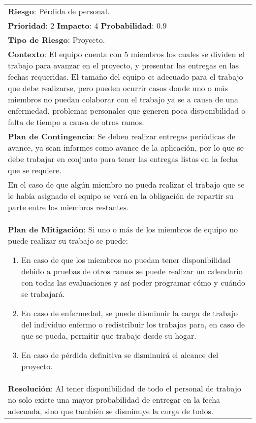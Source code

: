 \begin{table}[htbp!]
  \begin{tabular}{|p{15cm}|}\hline
    {\bf Riesgo}: P\'erdida de personal.\\%
    {\bf Prioridad}: 2  {\bf Impacto}: 4  {\bf Probabilidad}: 0.9\\%
    {\bf Tipo de Riesgo}: Proyecto.\\%
    {\bf Contexto}: El equipo cuenta con 5 miembros los cuales se dividen el trabajo para avanzar en el proyecto, y presentar las entregas en las fechas requeridas. El tama\~no del equipo es adecuado para el trabajo que debe realizarse, pero pueden ocurrir casos donde uno o m\'as miembros no puedan colaborar con el trabajo ya se a  causa de una enfermedad, problemas personales que generen poca disponibilidad o falta de tiempo a causa de otros ramos.\\%
    {\bf Plan de Contingencia}: Se deben realizar entregas peri\'odicas de avance, ya sean informes como avance de la aplicaci\'on, por lo que se debe trabajar en conjunto para tener las entregas listas en la fecha que se requiere.\\En el caso de que alg\'un miembro no pueda realizar el trabajo que se le hab\'ia asignado el equipo se ver\'a en la obligaci\'on de repartir su parte entre los miembros restantes.\\%
    {\bf Plan de Mitigaci\'on}: Si uno o m\'as de los miembros de equipo no puede realizar su trabajo se puede:\begin{enumerate}\item En caso de que los miembros no puedan tener disponibilidad debido a pruebas de otros ramos se puede realizar un calendario con todas las evaluaciones y as\'i poder programar c\'omo y cu\'ando se trabajar\'a.\item En caso de enfermedad, se puede disminuir la carga de trabajo del individuo enfermo o redistribuir los trabajos para, en caso de que se pueda, permitir que trabaje desde su hogar.\item En caso de p\'erdida definitiva se disminuir\'a el alcance del proyecto.\end{enumerate}\\%
    {\bf Resoluci\'on}: Al tener disponibilidad de todo el personal de trabajo no solo existe una mayor probabilidad de entregar en la fecha adecuada, sino que tambi\'en se disminuye la carga de todos.\\\hline
  \end{tabular}
  \caption{}
  \label{table:R6}
\end{table}


